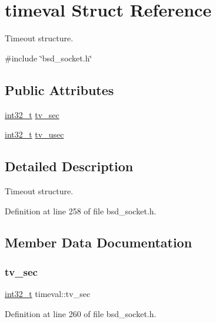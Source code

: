 \hypertarget{structtimeval}{}\section{timeval Struct Reference}
\label{structtimeval}


Timeout structure.  




{\ttfamily \#include \char`\"{}bsd\+\_\+socket.\+h\char`\"{}}

\subsection*{Public Attributes}
\begin{DoxyCompactItemize}
\item 
\hyperlink{stdint_8h_ab1967d8591af1a4e48c37fd2b0f184d0}{int32\+\_\+t} \hyperlink{structtimeval_a0f13475993d31d28005d68841a07da98}{tv\+\_\+sec}
\item 
\hyperlink{stdint_8h_ab1967d8591af1a4e48c37fd2b0f184d0}{int32\+\_\+t} \hyperlink{structtimeval_a63f01f050d9abb6422ced75deeb3333f}{tv\+\_\+usec}
\end{DoxyCompactItemize}


\subsection{Detailed Description}
Timeout structure. 

Definition at line 258 of file bsd\+\_\+socket.\+h.



\subsection{Member Data Documentation}
\mbox{\label{structtimeval_a0f13475993d31d28005d68841a07da98}} 
\subsubsection{\texorpdfstring{tv\+\_\+sec}{tv\_sec}}
{\footnotesize\ttfamily \hyperlink{stdint_8h_ab1967d8591af1a4e48c37fd2b0f184d0}{int32\+\_\+t} timeval\+::tv\+\_\+sec}



Definition at line 260 of file bsd\+\_\+socket.\+h.

\mbox{\label{structtimeval_a63f01f050d9abb6422ced75deeb3333f}} 
